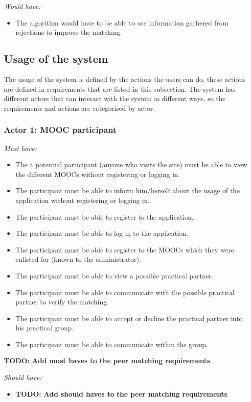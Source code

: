 \documentclass[]{article}
\newcommand{\TODO}[1]{{\color{red}\textbf{TODO: #1}}}
\newcommand{\reqr}[1]{{\noindent\emph{#1:}}}
\begin{document}
\reqr{Would have}
\begin{itemize}
\item The algorithm would have to be able to use information gathered from rejections to improve the matching.
\end{itemize}

\subsection{Usage of the system}
The usage of the system is defined by the actions the users can do, these actions are defined in requirements that are listed in this subsection.
The system has different actors that can interact with the system in different ways, so the requirements and actions are categorised by actor.

\subsubsection{Actor 1: MOOC participant}

\reqr{Must have}
\begin{itemize}
\item The a potential participant (anyone who visits the site) must be able to view the different MOOCs without registering or logging in.
\item The participant must be able to inform him/herself about the usage of the application without registering or logging in.
\item The participant must be able to register to the application.
\item The participant must be able to log in to the application.
\item The participant must be able to register to the MOOCs which they were enlisted for (known to the administrator).
\item The participant must be able to view a possible practical partner.
\item The participant must be able to communicate with the possible practical partner to verify the matching.
\item The participant must be able to accept or decline the practical partner into his practical group.
\item The participant must be able to communicate within the group.
\end{itemize}
\TODO{Add must haves to the peer matching requirements}

\reqr{Should have}
\begin{itemize}
\item \TODO{Add should haves to the peer matching requirements}
\end{itemize}
\end{document}
